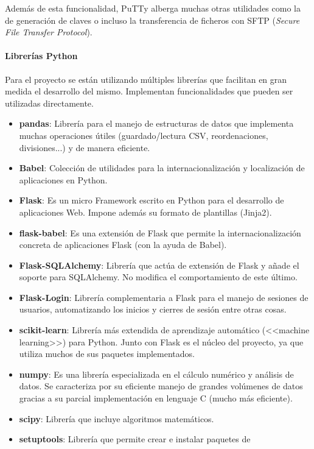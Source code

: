 Además de esta funcionalidad, PuTTy alberga muchas otras utilidades como la de
generación de claves o incluso la transferencia de ficheros con SFTP
(\textit{Secure File Transfer Protocol}).

\paragraph{Librerías Python}
Para el proyecto se están utilizando múltiples librerías que facilitan en gran
medida el desarrollo del mismo. Implementan funcionalidades que pueden ser
utilizadas directamente.

\begin{itemize}
	\item \textbf{pandas}: Librería para el manejo de estructuras de datos que
	implementa muchas operaciones útiles (guardado/lectura CSV, reordenaciones,
	divisiones...) y de manera eficiente.
	\item \textbf{Babel}: Colección de utilidades para la internacionalización y
	localización de aplicaciones en Python.
	\item \textbf{Flask}: Es un micro Framework escrito en Python para el
	desarrollo de aplicaciones Web. Impone además su formato de plantillas
	(Jinja2).
	\item \textbf{flask-babel}: Es una extensión de Flask que permite la
	internacionalización concreta de aplicaciones Flask (con la ayuda de Babel).
	\item \textbf{Flask-SQLAlchemy}: Librería que actúa de extensión de Flask y
	añade el soporte para SQLAlchemy. No modifica el comportamiento de este
	último.
	\item \textbf{Flask-Login}: Librería complementaria a Flask para el manejo
	de sesiones de usuarios, automatizando los inicios y cierres de sesión entre
	otras cosas.
	\item \textbf{scikit-learn}: Librería más extendida de aprendizaje
	automático (<<machine learning>>) para Python. Junto con Flask es el núcleo
	del proyecto, ya que utiliza muchos de sus paquetes implementados.
	\item \textbf{numpy}: Es una librería especializada en el cálculo numérico y
	análisis de datos. Se caracteriza por su eficiente manejo de grandes
	volúmenes de datos gracias a su parcial implementación en lenguaje C (mucho
	más eficiente).
	\item \textbf{scipy}: Librería que incluye algoritmos matemáticos.
	\item \textbf{setuptools}: Librería que permite crear e instalar paquetes de

\end{itemize}
